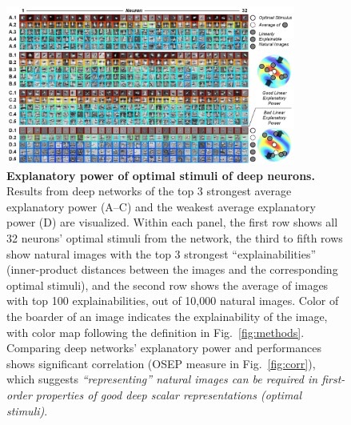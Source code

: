 \documentclass[10pt,twocolumn,letterpaper]{article}
\begin{document}
\begin{figure}
\begin{center}
\includegraphics[width=0.85\textwidth]{Figs/pic2.jpg} 
\end{center}
\caption{{\bf Explanatory power of optimal stimuli of deep neurons.}
Results from deep networks of the top 3 strongest average explanatory power (A--C) and the weakest average explanatory power (D) are visualized.
Within each panel, the first row shows all 32 neurons' optimal stimuli from the network, the third to fifth rows show natural images with the top 3 strongest ``explainabilities'' (\ie inner-product distances between the images and the corresponding optimal stimuli), and the second row shows the average of images with top 100 explainabilities, out of 10,000 natural images.
Color of the boarder of an image indicates the explainability of the image, with color map following the definition in Fig.~\ref{fig:methods}.
Comparing deep networks' explanatory power and performances shows significant correlation (OSEP measure in Fig.~\ref{fig:corr}), which suggests \emph{``representing'' natural images can be required in first-order properties of good deep scalar representations (\ie optimal stimuli)}.
}
\label{fig:exppow}
\end{figure}
\end{document}
